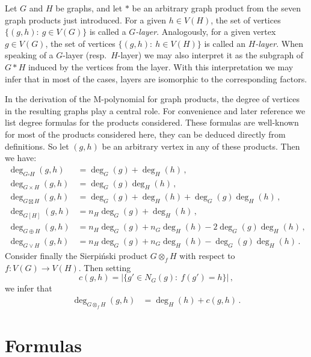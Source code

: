 \documentclass[letterpaper,12pt]{article}
\begin{document}
Let $G$ and $H$ be graphs, and let $\ast$ be an arbitrary graph product from the seven graph products just introduced. For a given $h\in V(H)$, the set of vertices $\{(g,h):\ g\in V(G)\}$ is called a {\em $G$-layer}. Analogously, for a given vertex $g\in V(G)$, the set of vertices $\{(g,h):\ h\in V(H)\}$ is called an {\em $H$-layer}. When speaking of a $G$-layer (resp.\ $H$-layer) we may also interpret it as the subgraph of $G\ast H$ induced by the vertices from the layer. With this interpretation we may infer that in most of the cases, layers are isomorphic to the corresponding factors. 

In the derivation of the M-polynomial for graph products, the degree of vertices in the resulting graphs play a central role. For convenience and later reference we list degree formulas for the products considered. These formulas are well-known for most of the products considered here, they can be deduced directly from definitions. So let $(g,h)$ be an arbitrary vertex in any of these products. Then we have: 
\begin{align}
\deg_{G\square H}(g,h) & =\deg_G(g) + \deg_H(h)\,, \label{lem:DegreeCartesian} \\
\deg_{G\times H}(g,h) & = \deg_G(g)\deg_H(h)\,, \label{lem:DegreeTensor} \\
\deg_{G\boxtimes H}(g,h) & = \deg_G(g) + \deg_H(h) + \deg_G(g)\deg_H(h)\,, \label{lem:DegreeStrong} \\
\deg_{G[H]}(g,h) & = n_H\deg_G(g)+\deg_H(h)\,, \label{lem:DegreeLexicographic} \\
\deg_{G\oplus H}(g,h) & = n_H \deg_G(g) + n_G\deg_H(h) - 2\deg_G(g)\deg_H(h)\,, \label{lem:DegreeSymmetric} \\
\deg_{G\vee H}(g,h) & = n_H \deg_G(g) + n_G\deg_H(h) - \deg_G(g)\deg_H(h)\,.\label{lem:DegreeDisjunction}
\end{align}
Consider finally the Sierpi\'{n}ski product $G\otimes_f H$ with respect to $f:V(G)\to V(H)$. Then setting 
$$c(g,h) = \bigl|\{g'\in N_G(g):\ f(g')=h\}\bigr|\,,$$
we infer that 
\begin{align}
\deg_{G\otimes_f H}(g,h) & = \deg_H(h) + c(g,h)\,. \label{lem:DegreeSierpinski}
\end{align}

\section{Formulas}
 \label{sec:formulas}
\end{document}
